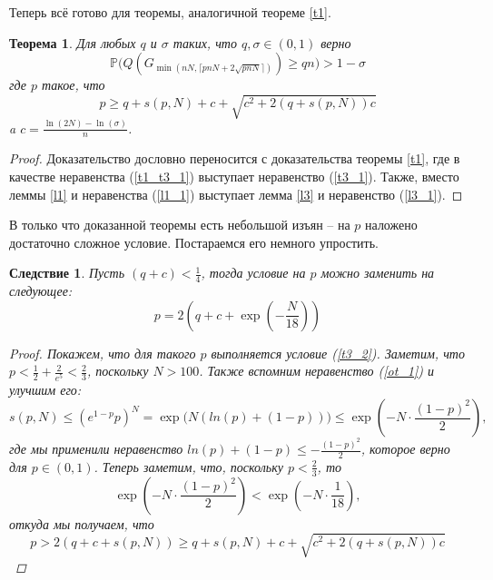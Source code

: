 \documentclass[10pt]{article}
\newcommand{\PRob}{\mathbb P}
\newcommand{\leqs}{\leqslant}
\newcommand{\geqs}{\geqslant}
\newtheorem{theorem}{Теорема}
\newtheorem{cons}{Следствие}
\theoremstyle{named}
\begin{document}
Теперь всё готово для теоремы, аналогичной теореме \ref{t1}.

\begin{theorem}\label{t3}
Для любых $q$ и $\sigma$ таких, что $q, \sigma \in (0,1)$ верно
\begin{equation}
\PRob\big(Q(G_{\min(nN, \lceil pnN + 2\sqrt{pnN} \rceil)}) \geqs qn\big) > 1 - \sigma
\end{equation}
где $p$ такое, что 
\begin{equation}\label{t3_2}
p \geqs q + s(p, N) + c + \sqrt{c^2+2(q+s(p, N))c}
\end{equation}
a $c = \frac{\ln(2N) - \ln(\sigma)}{n}$.
\end{theorem}
\begin{proof}
Доказательство дословно переносится с доказательства теоремы \ref{t1}, 
где в качестве неравенства (\ref{t1_t3_1}) выступает неравенство (\ref{t3_1}). 
Также, вместо леммы \ref{l1} и неравенства (\ref{l1_1}) выступает лемма \ref{l3} и неравенство (\ref{l3_1}).
\end{proof}

В только что доказанной теоремы есть небольшой изъян -- на $p$ наложено достаточно сложное условие. 
Постараемся его немного упростить.
\begin{cons}
Пусть $(q+c) < \frac{1}{4}$, тогда условие на $p$ можно заменить на следующее:
\begin{equation}
p = 2\left(q + c + \exp\left(-\frac{N}{18}\right) \right)
\end{equation}

\begin{proof}
Покажем, что для такого $p$ выполняется условие (\ref{t3_2}).
Заметим, что $p < \frac{1}{2} + \frac{2}{e^5} < \frac{2}{3}$, поскольку $N > 100$.
Также вспомним неравенство (\ref{ot_1}) и улучшим его:
\begin{equation}
s(p, N) \leqs (e^{1-p} p)^N 
	=
\exp\big(N( ln(p) + (1-p) )\big)
	\leqs
\exp\left( - N \cdot \frac{(1-p)^2}{2}\right),
\end{equation}
где мы применили неравенство $ln(p) + (1-p) \leqs - \frac{(1-p)^2}{2}$, которое верно для $p\in(0,1)$.
Теперь заметим, что, поскольку $p < \frac{2}{3}$, то 
\begin{equation}
\exp\left( - N \cdot \frac{(1-p)^2}{2}\right) < \exp\left( - N\cdot \frac{1}{18}\right),
\end{equation}
откуда мы получаем, что 
\begin{equation}
p > 2(q+c+s(p,N)) \geqs q + s(p, N) + c + \sqrt{c^2+2(q+s(p, N))c}
\end{equation}
\end{proof}
\end{cons}
\end{document}
